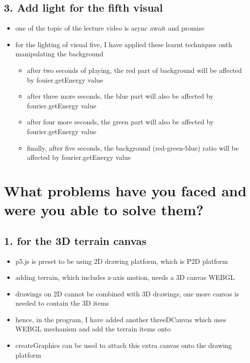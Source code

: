\subsection*{3. Add light for the fifth visual}

\begin{itemize}
  \item one of the topic of the lecture video is async await and promise
  \item for the lighting of visual five, I have applied these learnt techniques onth manipulating the background
    \begin{itemize}
      \item after two seconds of playing, the red part of background will be affected by fouier.getEnergy value
      \item after three more seconds, the blue part will also be affected by fourier.getEnergy value
      \item after four more seconds, the green part will also be affected by fourier.getEnergy value
      \item finally, after five seconds, the background (red-green-blue) ratio will be affected by fourier.getEnergy value
    \end{itemize}
\end{itemize}

\section*{What problems have you faced and were you able to solve them?}

\subsection*{1. for the 3D terrain canvas}

\begin{itemize}
  \item p5.js is preset to be using 2D drawing platform, which is P2D platform
  \item adding terrain, which includes z-axis motion, needs a 3D canvas WEBGL
  \item drawings on 2D cannot be combined with 3D drawings, one more canvas is needed to contain the 3D items
  \item hence, in the program, I have added another threeDCanvas which uses WEBGL mechanism and add the terrain items onto
  \item createGraphics can be used to attach this extra canvas onto the drawing platform
\end{itemize}

